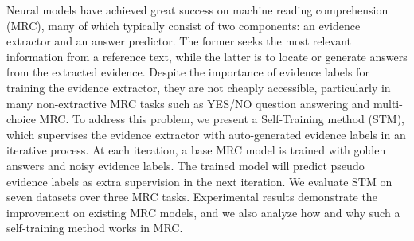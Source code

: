 Neural models have achieved great success on machine reading comprehension (MRC), many of which typically consist of two components: an evidence extractor and an answer predictor. The former seeks the most relevant information from a reference text, while the latter is to locate or generate answers from the extracted evidence.  Despite the importance of evidence labels for training the evidence extractor, they are not cheaply accessible, particularly in many non-extractive MRC tasks such as YES/NO question answering and multi-choice MRC. To address this problem, we present a Self-Training method (STM), which supervises the evidence extractor with auto-generated evidence labels in an iterative process. At each iteration, a base MRC model is trained with golden answers and noisy evidence labels. The trained model will predict pseudo evidence labels as extra supervision in the next iteration. We evaluate STM on seven datasets over three MRC tasks. Experimental results demonstrate the improvement on existing MRC models, and we also analyze how and why such a self-training method works in MRC.
